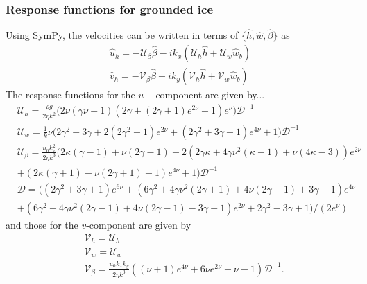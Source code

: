 \documentclass[paper=a4, fontsize=11pt]{article}
\begin{document}
\subsubsection*{Response functions for grounded ice}
Using SymPy, the velocities can be written in terms of $\{\widehat{h},\widehat{w},\widehat{\beta}\}$ as
\begin{align}
\widehat{u}_h =    -\mathcal{U}_{\beta} \widehat{\beta} -ik_x\left(\mathcal{U}_h\widehat{h} +  \mathcal{U}_w\widehat{w}_b\right) \label{uH}\\
\widehat{v}_h =  -\mathcal{V}_{\beta} \widehat{\beta}-ik_y\left(\mathcal{V}_h\widehat{h} +  \mathcal{V}_w\widehat{w}_b\right)\label{vH}
\end{align}
The response functions for the $u-$component are given by...
\begin{align*}
& \mathcal{U}_h   =  \frac{\rho g}{2\eta k^2} \bigg(2\nu(\gamma\nu+1)(2\gamma+(2\gamma+1)e^{2\nu}-1)e^\nu \bigg)\mathcal{D}^{-1}  \\
& \mathcal{U}_w  = \frac{1}{k}\nu\bigg(2\gamma^2-3\gamma+2(2\gamma^2-1)e^{2\nu}+(2\gamma^2+3\gamma+1)e^{4\nu} + 1  \bigg)\mathcal{D}^{-1} \\
& \mathcal{U}_\beta  = \frac{u_0 k_x^2}{2\eta k^3}\bigg(2\kappa(\gamma-1) + \nu(2\gamma-1)+2(2\gamma\kappa+4\gamma\nu^2(\kappa-1)+\nu(4\kappa-3))e^{2\nu} \\ &+ (2\kappa(\gamma+1)-\nu(2\gamma+1)-1)e^{4\nu}+1 \bigg)\mathcal{D}^{-1}  \\
& \mathcal{D}  =  \bigg((2\gamma^2+3\gamma+1)e^{6\nu} + (6\gamma^2 + 4\gamma\nu^2(2\gamma+1) + 4\nu(2\gamma+1)+ 3\gamma -1 )e^{4\nu} \\ &+ (6\gamma^2 + 4\gamma\nu^2(2\gamma-1)+ 4\nu(2\gamma-1)-3\gamma -1)e^{2\nu} +2\gamma^2-3\gamma + 1\bigg)/(2e^{\nu})
\end{align*}
and those for the $v$-component are given by
\begin{align}
  & \mathcal{V}_h = \mathcal{U}_h\\
  & \mathcal{V}_w = \mathcal{U}_w\\
  & \mathcal{V}_\beta  =  \frac{u_0 k_x k_y}{2\eta k^3}\left((\nu+1)e^{4\nu} +6\nu e^{2\nu} + \nu-1\right)\mathcal{D}^{-1} .
\end{align}
\end{document}
